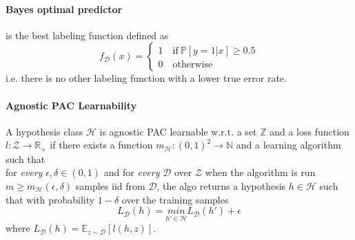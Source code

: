 \paragraph{Bayes optimal predictor} is the best labeling function defined as
\[
	f_{\mathcal{D}}(x) = 
        \begin{cases} 
            \text{1} \quad \text{if} ~\mathbb{P}[y=1 | x] \geq 0.5\\
            \text{0} \quad \text{otherwise}
        \end{cases}
\]
i.e. there is no other labeling function with a lower true error rate.

\paragraph{Agnostic PAC Learnability} A hypothesis class $\mathcal{H}$ is agnostic PAC learnable w.r.t. a set $\mathbb{Z}$ and a loss function $l: \mathcal{Z} \to \mathbb{R}_+$ if there exists a function $m_\mathcal{H}: (0,1)^2 \to \mathbb{N}$ and a learning algorithm such that\\
for \textit{every} $\epsilon, \delta \in (0,1)$ and for  \textit{every} $\mathcal{D}$ over $\mathcal{Z}$ when the algorithm is run $m \geq m_\mathcal{H}(\epsilon, \delta)$ samples iid from $\mathcal{D}$, the algo returns a hypothesis $h \in \mathcal{H}$ such that with probability $1 - \delta$ over the training samples
\[
	L_\mathcal{D}(h) = \underset{h' \in \mathcal{H}}{min} L_\mathcal{D}(h') + \epsilon
\]
where $L_\mathcal{D}(h) = \mathbb{E}_{z\sim\mathcal{D}}[l(h,z)]$.
